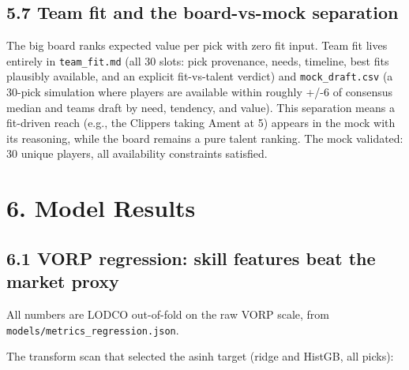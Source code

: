 \documentclass[
  10pt,
]{article}
\begin{document}
\subsection{5.7 Team fit and the board-vs-mock
separation}\label{team-fit-and-the-board-vs-mock-separation}

The big board ranks expected value per pick with zero fit input. Team fit lives
entirely in \texttt{team\_fit.md} (all 30 slots: pick provenance, needs,
timeline, best fits plausibly available, and an explicit fit-vs-talent verdict)
and \texttt{mock\_draft.csv} (a 30-pick simulation where players are available
within roughly +/-6 of consensus median and teams draft by need, tendency, and
value). This separation means a fit-driven reach (e.g., the Clippers taking
Ament at 5) appears in the mock with its reasoning, while the board remains a
pure talent ranking. The mock validated: 30 unique players, all availability
constraints satisfied.

\section{6. Model Results}\label{model-results}

\subsection{6.1 VORP regression: skill features beat the market
proxy}\label{vorp-regression-skill-features-beat-the-market-proxy}

All numbers are LODCO out-of-fold on the raw VORP scale, from
\texttt{models/metrics\_regression.json}.

The transform scan that selected the asinh target (ridge and HistGB, all picks):
\end{document}
